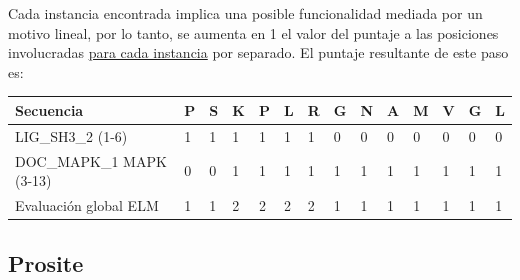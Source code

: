 Cada instancia encontrada implica una posible funcionalidad mediada por un motivo lineal, por lo tanto, se aumenta en 1 el valor del puntaje a las posiciones involucradas \underline{para cada instancia} por separado.
El puntaje resultante de este paso es:

\vspace{0.5cm}
\begin{tabular}{llllllllllllll} 
\hline
Secuencia & \textbf{P} & \textbf{S} & \textbf{K} & \textbf{P} & \textbf{L} & \textbf{R} & \textbf{G} & \textbf{N} & \textbf{A} & \textbf{M} & \textbf{V} & \textbf{G} & \textbf{L} \\ \hline
LIG\_SH3\_2 (1-6) 		& 1 & 1 & 1 & 1 & 1 & 1 & 0 & 0 & 0 & 0 & 0 & 0 & 0\\ \hline
DOC\_MAPK\_1 MAPK (3-13)  	& 0 & 0 & 1 & 1 & 1 & 1 & 1 & 1 & 1 & 1 & 1 & 1 & 1 \\ \hline
Evaluación global ELM 		& 1 & 1 & 2 & 2 & 2 & 2 & 1 & 1 & 1 & 1 & 1 & 1 & 1\\ \hline
\end{tabular}














\subsection{Prosite}\label{prosite}

